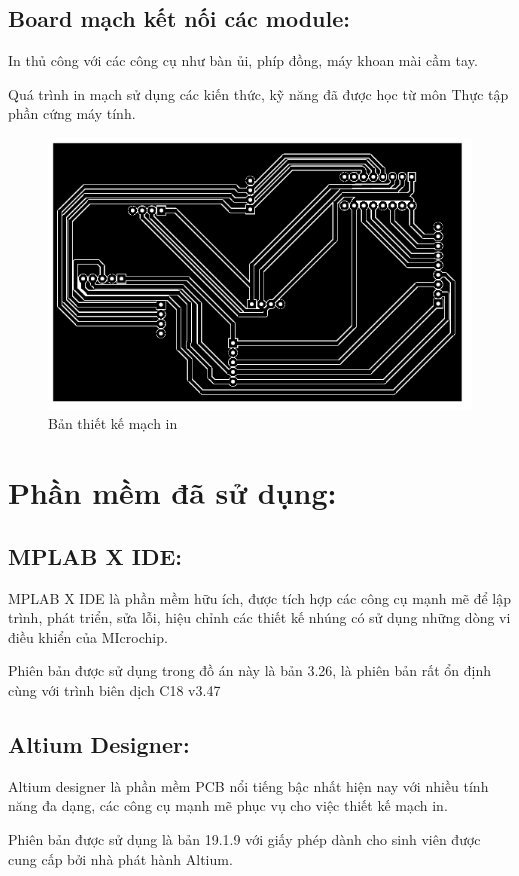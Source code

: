 \documentclass[a4paper]{article}
\begin{document}
\subsection{Board mạch kết nối các module:}

In thủ công với các công cụ như bàn ủi, phíp đồng, máy khoan mài cầm tay.

Quá trình in mạch sử dụng các kiến thức, kỹ năng đã được học từ môn Thực tập phần cứng máy tính.
\begin{figure}[H]
\begin{center}
\includegraphics[width=12cm]{pic2.png}
\caption{Bản thiết kế mạch in}
\end{center}
\end{figure}
\section{Phần mềm đã sử dụng:}
\subsection{MPLAB X IDE:}
MPLAB X IDE là phần mềm hữu ích, được tích hợp các công cụ mạnh mẽ để lập trình, phát triển, sửa lỗi, hiệu chỉnh các thiết kế nhúng có sử dụng những dòng vi điều khiển của MIcrochip.

Phiên bản được sử dụng trong đồ án này là bản 3.26, là phiên bản rất ổn định cùng với trình biên dịch C18 v3.47
\subsection{Altium Designer:}
Altium designer là phần mềm PCB nổi tiếng bậc nhất hiện nay với nhiều tính năng đa dạng, các công cụ mạnh mẽ phục vụ cho việc thiết kế mạch in.

Phiên bản được sử dụng là bản 19.1.9 với giấy phép dành cho sinh viên được cung cấp bởi nhà phát hành Altium.
\end{document}
